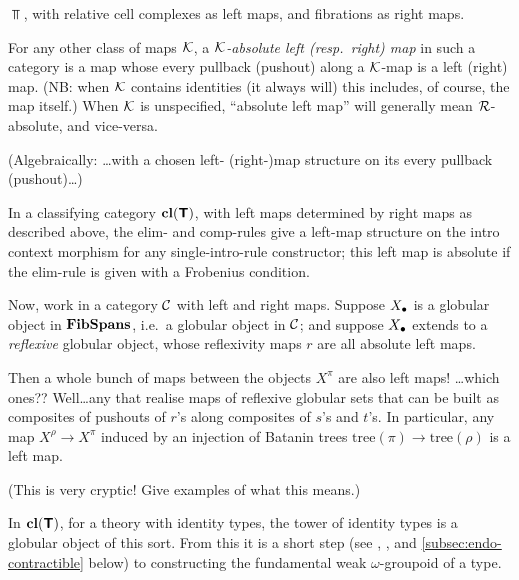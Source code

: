 \documentclass{amsart}
\newcommand{\tr}{\mathrm{tree}}
\begin{document}
\begin{example}$\Top$, with relative cell complexes as left maps, and fibrations as right maps.
\end{example}

\begin{definition}For any other class of maps $\mathcal{K}$, a \emph{$\mathcal{K}$-absolute left (resp.\ right) map} in such a category is a map whose every pullback (pushout) along a $\mathcal{K}$-map is a left (right) map.  (NB: when $\mathcal{K}$ contains identities (it always will) this includes, of course, the map itself.)  When $\mathcal{K}$ is unspecified, ``absolute left map'' will generally mean $\mathcal{R}$-absolute, and vice-versa.

(Algebraically: \ldots with a chosen left- (right-)map structure on its every pullback (pushout)\ldots)  
\end{definition}

\begin{example}In a classifying category $\mathbf{cl}(\textbf{\textsf{T}})$, with left maps determined by right maps as described above, the elim- and comp-rules give a left-map structure on the intro context morphism for any single-intro-rule constructor; this left map is absolute if the elim-rule is given with a Frobenius condition.
\end{example}

Now, work in a category $\mathcal{C}$ with left and right maps.  Suppose $X_\bullet$ is a globular object in $\mathbf{FibSpans}$, i.e.\ a globular object in $\mathcal{C}$; and suppose $X_\bullet$ extends to a \emph{reflexive} globular object, whose reflexivity maps $r$ are all absolute left maps.

Then a whole bunch of maps between the objects $X^\pi$ are also left maps!  \ldots which ones??  Well\ldots any that realise maps of reflexive globular sets that can be built as composites of pushouts of $r$'s along composites of $s$'s and $t$'s.  In particular, any map $X^\rho \to X^\pi$ induced by an injection of Batanin trees $\tr(\pi) \to \tr(\rho)$ is a left map.

(This is very cryptic!  Give examples of what this means.)

\begin{example}
In $\mathbf{cl}(\textbf{\textsf{T}})$, for a theory with identity types, the tower of identity types is a globular object of this sort.  From this it is a short step (see \cite{lumsdaine:tlca-journal}, \cite{garner-van-den-berg}, and \ref{subsec:endo-contractible} below) to constructing the fundamental weak $\omega$-groupoid of a type.
\end{example}
\end{document}
